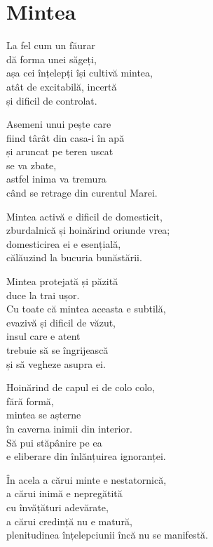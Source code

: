 
\chapter{Mintea}


La fel cum un făurar\\
dă forma unei săgeți,\\
așa cei înțelepți își cultivă mintea,\\
atât de excitabilă, incertă\\
și dificil de controlat.

Asemeni unui pește care\\
fiind târât din casa-i în apă\\
și aruncat pe teren uscat\\
se va zbate,\\
astfel inima va tremura\\
când se retrage din curentul Marei.


Mintea activă e dificil de domesticit,\\
zburdalnică și hoinărind oriunde vrea;\\
domesticirea ei e esențială,\\
călăuzind la bucuria bunăstării.


Mintea protejată și păzită\\
duce la trai ușor.\\
Cu toate că mintea aceasta e subtilă,\\
evazivă și dificil de văzut,\\
insul care e atent\\
trebuie să se îngrijească\\
și să vegheze asupra ei.


Hoinărind de capul ei de colo colo,\\
fără formă,\\
mintea se așterne\\
în caverna inimii din interior.\\
Să pui stăpânire pe ea\\
e eliberare din înlănțuirea ignoranței.


În acela a cărui minte e nestatornică,\\
a cărui inimă e nepregătită\\
cu învățături adevărate,\\
a cărui credință nu e matură,\\
plenitudinea înțelepciunii încă nu se manifestă.


